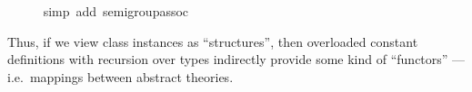 \begin{isabellebody}
\ \ \ \ \isamarkupfalse%
\ {\isacharparenleft}simp\ add{\isacharcolon}\ semigroup{\isachardot}assoc{\isacharparenright}\isanewline
{}\isamarkupfalse%
%
\endisatagproof
{\isafoldproof}%
%
\isadelimproof
%
\endisadelimproof
%
\begin{isamarkuptext}%
Thus, if we view class instances as ``structures'', then overloaded
  constant definitions with recursion over types indirectly provide
  some kind of ``functors'' --- i.e.\ mappings between abstract
  theories.%
\end{isamarkuptext}%
\isamarkuptrue%
%
\isadelimtheory
%
\endisadelimtheory
%
\isatagtheory
{}\isamarkupfalse%
%
\endisatagtheory
{\isafoldtheory}%
%
\isadelimtheory
%
\endisadelimtheory
\isanewline
\end{isabellebody}%
